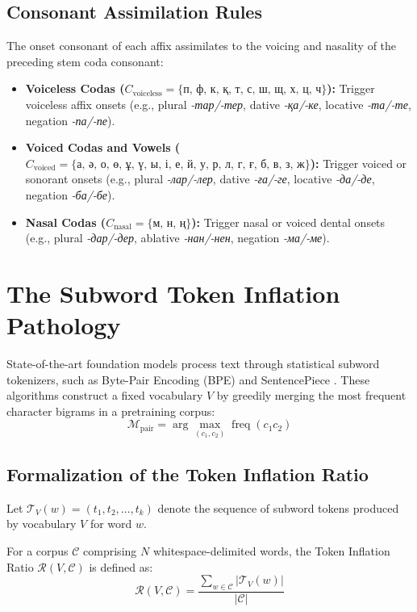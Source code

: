 \subsection{Consonant Assimilation Rules}
The onset consonant of each affix assimilates to the voicing and nasality of the preceding stem coda consonant:
\begin{itemize}
    \item \textbf{Voiceless Codas ($C_{\text{voiceless}} = \{\text{п, ф, к, қ, т, с, ш, щ, х, ц, ч}\}$):} Trigger voiceless affix onsets (e.g., plural \textit{-тар/-тер}, dative \textit{-қа/-ке}, locative \textit{-та/-те}, negation \textit{-па/-пе}).
    \item \textbf{Voiced Codas and Vowels ($C_{\text{voiced}} = \{\text{а, ә, о, ө, ұ, ү, ы, і, е, й, у, р, л, г, ғ, б, в, з, ж}\}$):} Trigger voiced or sonorant onsets (e.g., plural \textit{-лар/-лер}, dative \textit{-ға/-ге}, locative \textit{-да/-де}, negation \textit{-ба/-бе}).
    \item \textbf{Nasal Codas ($C_{\text{nasal}} = \{\text{м, н, ң}\}$):} Trigger nasal or voiced dental onsets (e.g., plural \textit{-дар/-дер}, ablative \textit{-нан/-нен}, negation \textit{-ма/-ме}).
\end{itemize}

\section{The Subword Token Inflation Pathology}
\label{sec:ling_inflation}

State-of-the-art foundation models process text through statistical subword tokenizers, such as Byte-Pair Encoding (BPE) \citep{sennrich2016subword} and SentencePiece \citep{kudo2018sentencepiece}. These algorithms construct a fixed vocabulary $V$ by greedily merging the most frequent character bigrams in a pretraining corpus:
\begin{equation}
\mathcal{M}_{\text{pair}} = \arg\max_{(c_1, c_2)} \operatorname{freq}(c_1 c_2)
\end{equation}

\subsection{Formalization of the Token Inflation Ratio}
Let $\mathcal{T}_V(w) = (t_1, t_2, \dots, t_k)$ denote the sequence of subword tokens produced by vocabulary $V$ for word $w$.
\begin{definition}
For a corpus $\mathcal{C}$ comprising $N$ whitespace-delimited words, the Token Inflation Ratio $\mathcal{R}(V, \mathcal{C})$ is defined as:
\begin{equation}
\label{eq:token_inflation_ratio}
\mathcal{R}(V, \mathcal{C}) = \frac{\sum_{w \in \mathcal{C}} |\mathcal{T}_V(w)|}{|\mathcal{C}|}
\end{equation}
\end{definition}

